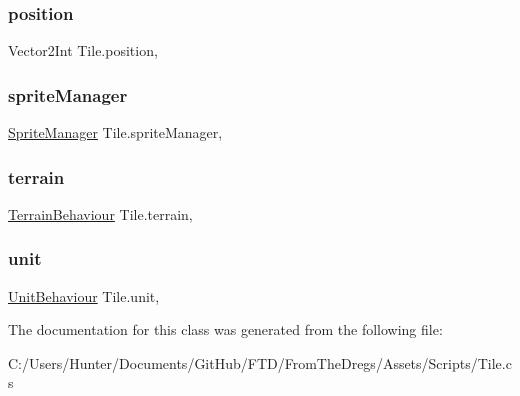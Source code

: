 \mbox{\label{class_tile_aa4046f981671278e33441b6f001b3e9e}} 
\subsubsection{\texorpdfstring{position}{position}}
{\footnotesize\ttfamily Vector2\+Int Tile.\+position\hspace{0.3cm}{\ttfamily [get]}, {\ttfamily [set]}}

\mbox{\label{class_tile_a4a7a173c171f17656e7aa129ed46c17c}} 
\subsubsection{\texorpdfstring{spriteManager}{spriteManager}}
{\footnotesize\ttfamily \mbox{\hyperlink{class_sprite_manager}{Sprite\+Manager}} Tile.\+sprite\+Manager\hspace{0.3cm}{\ttfamily [get]}, {\ttfamily [set]}}

\mbox{\label{class_tile_af45cdc1d322c30f61893f1e7de16e668}} 
\subsubsection{\texorpdfstring{terrain}{terrain}}
{\footnotesize\ttfamily \mbox{\hyperlink{class_terrain_behaviour}{Terrain\+Behaviour}} Tile.\+terrain\hspace{0.3cm}{\ttfamily [get]}, {\ttfamily [set]}}

\mbox{\label{class_tile_ac8a152fbb0fd0aec60d876b86bf1cb66}} 
\subsubsection{\texorpdfstring{unit}{unit}}
{\footnotesize\ttfamily \mbox{\hyperlink{class_unit_behaviour}{Unit\+Behaviour}} Tile.\+unit\hspace{0.3cm}{\ttfamily [get]}, {\ttfamily [set]}}



The documentation for this class was generated from the following file\+:\begin{DoxyCompactItemize}
\item 
C\+:/\+Users/\+Hunter/\+Documents/\+Git\+Hub/\+F\+T\+D/\+From\+The\+Dregs/\+Assets/\+Scripts/Tile.\+cs\end{DoxyCompactItemize}
